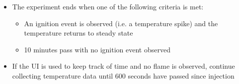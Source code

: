 \documentclass[letterpaper,11pt]{article}
\begin{document}
\begin{enumerate}
\begin{itemize}
        \item The experiment ends when one of the following criteria is met:
            \begin{itemize} 
            \item An ignition event is observed (i.e. a temperature spike) 
                and the temperature returns to steady state
            \item 10 minutes pass with no ignition event observed
            \end{itemize}
        \item If the UI is used to keep track of time and no flame is observed, 
            continue collecting temperature data until 600 seconds have passed 
            since injection
        \end{itemize}
    

\end{enumerate}
\end{document}
